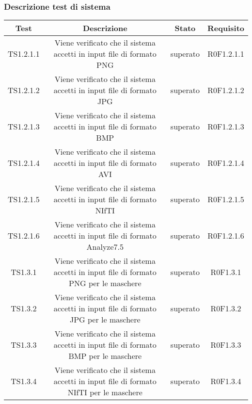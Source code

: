 \subsubsection{Descrizione test di sistema}
\label{descrizionetestdisistema}	

\newdimen\larghezza
\setlength{\larghezza}{7cm}
\newdimen\dimTipo
\setlength{\dimTipo}{2cm}
\newdimen\dimFonti
\setlength{\dimFonti}{2cm}
	

\begin{center}
\begin{longtable}[!h]{|c|c|c|c|}
\hline



\textbf{Test} & \textbf{Descrizione} & \textbf{Stato} & \textbf{Requisito} \\


\hline
TS1.2.1.1 & \parbox[t]{\larghezza}{Viene verificato che il sistema accetti in input file di formato PNG}  & superato & R0F1.2.1.1 \\ 
\hline
TS1.2.1.2 & \parbox[t]{\larghezza}{Viene verificato che il sistema accetti in input file di formato JPG}  & superato & R0F1.2.1.2 \\ 
\hline
TS1.2.1.3 & \parbox[t]{\larghezza}{Viene verificato che il sistema accetti in input file di formato BMP}  & superato & R0F1.2.1.3 \\ 
\hline
TS1.2.1.4 & \parbox[t]{\larghezza}{Viene verificato che il sistema accetti in input file di formato AVI}  & superato & R0F1.2.1.4 \\ 
\hline
TS1.2.1.5 & \parbox[t]{\larghezza}{Viene verificato che il sistema accetti in input file di formato NIfTI}  & superato & R0F1.2.1.5 \\ 
\hline
TS1.2.1.6 & \parbox[t]{\larghezza}{Viene verificato che il sistema accetti in input file di formato Analyze7.5}  & superato & R0F1.2.1.6 \\ 
\hline
TS1.3.1 & \parbox[t]{\larghezza}{Viene verificato che il sistema accetti in input file di formato PNG per le maschere }  & superato & R0F1.3.1 \\ 
\hline
TS1.3.2 & \parbox[t]{\larghezza}{Viene verificato che il sistema accetti in input file di formato JPG per le maschere }  & superato & R0F1.3.2 \\ 
\hline
TS1.3.3 & \parbox[t]{\larghezza}{Viene verificato che il sistema accetti in input file di formato BMP per le maschere }  & superato & R0F1.3.3 \\ 
\hline
TS1.3.4 & \parbox[t]{\larghezza}{Viene verificato che il sistema accetti in input file di formato NIfTI per le maschere }  & superato & R0F1.3.4 \\ 

\end{longtable}
\end{center}
